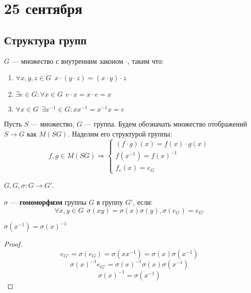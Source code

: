 \chapter{25 сентября}

\section{Структура групп}

\begin{definition}[группа]
    \(G\) --- множество с внутренним законом \( \cdot \), таким что:
    \begin{enumerate}
        \item \(\forall x, y, z \in G \ \ x \cdot (y \cdot z) = (x \cdot y) \cdot z\)
        \item \(\exists e \in G : \forall x \in G \ \ e \cdot x = x \cdot e = x\)
        \item \(\forall x \in G \ \ \exists x^{-1} \in G : x x^{-1} = x^{-1} x = e\)
    \end{enumerate}
\end{definition}

\begin{example}
    Пусть \(S\) --- множество, \(G\) --- группа. Будем обозначать множество отображений \(S \to G\) как \(M(SG)\). Наделим его структурой группы:
    \[f, g \in M(SG) \Rightarrow \begin{cases}
            (f \cdot g)(x) = f(x) \cdot g(x) \\
            f(x^{-1}) = f(x)^{ - 1}          \\
            f_e(x) = e_G
        \end{cases}\]
\end{example}

\begin{definition}
    \(G, G, \sigma : G \to G'\).

    \(\sigma\) --- \textbf{гомоморфизм} группы \(G\) в группу \(G'\), если:
    \[\forall x, y \in G \ \ \sigma(xy) = \sigma(x) \sigma(y), \sigma(e_G) = e_{G'}\]
\end{definition}

\begin{lemma}
    \(\sigma(x^{-1}) = \sigma(x)^{-1}\)
\end{lemma}
\begin{proof}
    \[e_{G'} = \sigma(e_G) = \sigma(x x^{-1}) = \sigma(x) \sigma(x^{-1})\]
    \[\sigma(x)^{-1} e_{G'} = \sigma(x)^{-1} \sigma(x) \sigma(x^{-1})\]
    \[\sigma(x)^{-1} = \sigma(x^{-1})\]
\end{proof}

